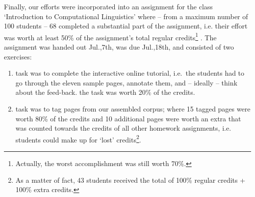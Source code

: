 \documentclass[12pt]{article}
\begin{document}
Finally, our efforts were incorporated into an assignment for the class `Introduction to Computational Linguistics' where -- from a maximum number of 100 students -- 68 completed a substantial part of the assignment, i.e. their effort was worth at least 50\% of the assignment's total regular credits\footnote{Actually, the worst accomplishment was still worth 70\%.} .
The assignment was handed out Jul.,7th, was due Jul.,18th, and consisted of two exercises:
\begin{enumerate}
	\item task was to complete the interactive online tutorial, i.e.~the students had to go through the eleven sample pages, annotate them, and -- ideally -- think about the feed-back. the task was worth 20\% of the credits.
	\item task was to tag pages from our assembled corpus; where 15 tagged pages were worth 80\% of the credits and 10 additional pages were worth an extra that was counted towards the credits of all other homework assignments, i.e. students could make up for `lost' credits\footnote{As a matter of fact, 43 students received the total of 100\% regular credits + 100\% extra credits.}.
\end{enumerate}



\end{document}
